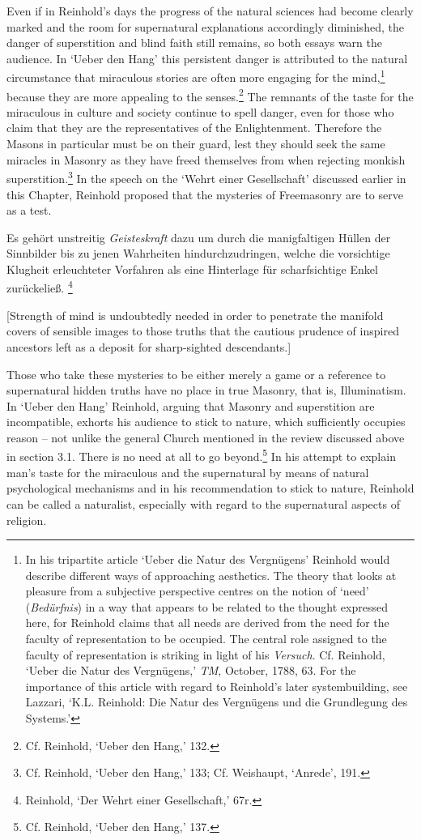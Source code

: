  Even if in Reinhold's days the progress of the natural sciences had become clearly marked and the room for supernatural explanations accordingly diminished, the danger of superstition and blind faith still remains, so both essays warn the audience. In `Ueber den Hang' this persistent danger is attributed to the natural circumstance that miraculous stories are often more engaging for the mind,\footnote{ In his tripartite article `Ueber die Natur des Vergn\"{u}gens' Reinhold would describe different ways of approaching aesthetics. The theory that looks at pleasure from a subjective perspective centres on the notion of `need' (\textit{Bed\"{u}rfnis}) in a way that appears to be related to the thought expressed here, for Reinhold claims that all needs are derived from the need for the faculty of representation to be occupied. The central role assigned to the faculty of representation is striking in light of his \textit{Versuch}. Cf. Reinhold, `Ueber die Natur des Vergn\"{u}gens,' \textit{TM}, October, 1788, 63. For the importance of this article with regard to Reinhold's later systembuilding, see Lazzari, `K.L. Reinhold: Die Natur des Vergn\"{u}gens und die Grundlegung des Systems.'} because they are more appealing to the senses.\footnote{ Cf. Reinhold, `Ueber den Hang,' 132.} The remnants of the taste for the miraculous in culture and society continue to spell danger, even for those who claim that they are the representatives of the Enlightenment. Therefore the Masons in particular must be on their guard, lest they should seek the same miracles in Masonry as they have freed themselves from when rejecting monkish superstition.\footnote{ Cf. Reinhold, `Ueber den Hang,' 133; Cf. Weishaupt, `Anrede', 191.} In the speech on the `Wehrt einer Gesellschaft' discussed earlier in this Chapter, Reinhold proposed that the mysteries of Freemasonry are to serve as a test. 

Es geh\"{o}rt unstreitig \textit{Geisteskraft} dazu um durch die manigfaltigen H\"{u}llen der Sinnbilder bis zu jenen Wahrheiten hindurchzudringen, welche die vorsichtige Klugheit erleuchteter Vorfahren als eine Hinterlage f\"{u}r scharfsichtige Enkel zur\"{u}ckelie\ss{}. \footnote{ Reinhold, `Der Wehrt einer Gesellschaft,' 67r.}

[Strength of mind is undoubtedly needed in order to penetrate the manifold covers of sensible images to those truths that the cautious prudence of inspired ancestors left as a deposit for sharp{-}sighted descendants.]

Those who take these mysteries to be either merely a game or a reference to supernatural hidden truths have no place in true Masonry, that is, Illuminatism. In `Ueber den Hang' Reinhold, arguing that Masonry and superstition are incompatible, exhorts his audience to stick to nature, which sufficiently occupies reason {--} not unlike the general Church mentioned in the review discussed above in section 3.1. There is no need at all to go beyond.\footnote{ Cf. Reinhold, `Ueber den Hang,' 137.} In his attempt to explain man's taste for the miraculous and the supernatural by means of natural psychological mechanisms and in his recommendation to stick to nature, Reinhold can be called a naturalist, especially with regard to the supernatural aspects of religion. 

